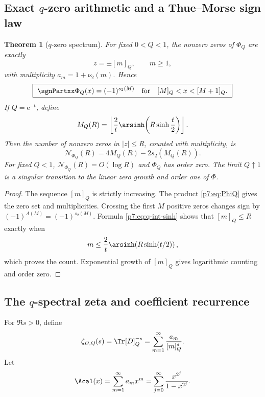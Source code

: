 \documentclass[11pt]{article}
\numberwithin{equation}{section}
\newtheorem{theorem}{Theorem}[section]
\theoremstyle{definition}
\theoremstyle{remark}
\newcommand{\e}{\mathrm e}
\begin{document}
\subsection{Exact $q$-zero arithmetic and a Thue--Morse sign law}

\begin{theorem}[$q$-zero spectrum]\label{p7:thm:q-zeros}
For fixed $0<Q<1$, the nonzero zeros of $\Phi_Q$ are exactly
\begin{equation}\label{p7:eq:q-zero-set}
 z=\pm[m]_Q,\qquad m\ge1,
\end{equation}
with multiplicity $a_m=1+\nu_2(m)$.  Hence
\begin{equation}\label{p7:eq:q-sign}
 \boxed{\ \sgnPartxx\Phi_Q(x)=(-1)^{s_2(M)}
 \quad\text{for}\quad [M]_Q<x<[M+1]_Q.\ }
\end{equation}
If $Q=\e^{-t}$, define
\begin{equation}\label{p7:eq:MQ}
 M_Q(R)=\left\lfloor
 \frac2t\arsinh\!\left(R\sinh\frac t2\right)
 \right\rfloor.
\end{equation}
Then the number of nonzero zeros in $|z|\le R$, counted with multiplicity, is
\begin{equation}\label{p7:eq:q-zero-count}
 \boxed{\ \mathcal N_{\Phi_Q}(R)
 =4M_Q(R)-2s_2(M_Q(R)).\ }
\end{equation}
For fixed $Q<1$, $\mathcal N_{\Phi_Q}(R)=O(\log R)$ and $\Phi_Q$ has order zero.  The limit $Q\uparrow1$ is a singular transition to the linear zero growth and order one of $\Phi$.
\end{theorem}

\begin{proof}
The sequence $[m]_Q$ is strictly increasing.  The product \cref{p7:eq:PhiQ} gives the zero set and multiplicities.  Crossing the first $M$ positive zeros changes sign by $(-1)^{A(M)}=(-1)^{s_2(M)}$.  Formula \cref{p7:eq:q-int-sinh} shows that $[m]_Q\le R$ exactly when
\[
 m\le\frac2t\arsinh\!\left(R\sinh(t/2)\right),
\]
which proves the count.  Exponential growth of $[m]_Q$ gives logarithmic counting and order zero.
\end{proof}

\subsection{The $q$-spectral zeta and coefficient recurrence}

For $\Re s>0$, define
\begin{equation}\label{p7:eq:zetaDQ}
 \zeta_{D,Q}(s)=\Tr[D]_Q^{-s}
 =\sum_{m=1}^{\infty}\frac{a_m}{[m]_Q^s}.
\end{equation}
Let
\begin{equation}\label{p7:eq:A-lambert}
 \Acal(x)=\sum_{m=1}^{\infty}a_mx^m
 =\sum_{j=0}^{\infty}\frac{x^{2^j}}{1-x^{2^j}}.
\end{equation}
\end{document}

